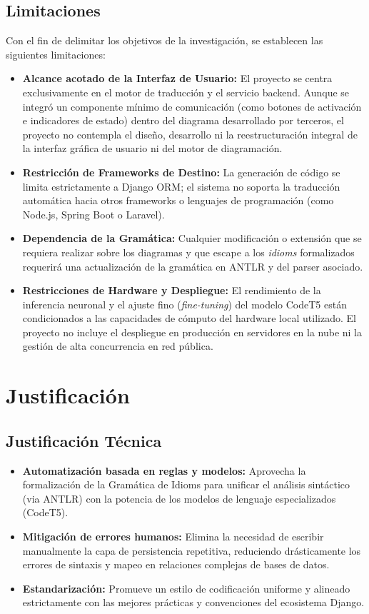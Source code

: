 \subsection{Limitaciones}
Con el fin de delimitar los objetivos de la investigación, se establecen las siguientes limitaciones:
\begin{itemize}
    \item \textbf{Alcance acotado de la Interfaz de Usuario:} El proyecto se centra exclusivamente en el motor de traducción y el servicio backend. Aunque se integró un componente mínimo de comunicación (como botones de activación e indicadores de estado) dentro del diagrama desarrollado por terceros, el proyecto no contempla el diseño, desarrollo ni la reestructuración integral de la interfaz gráfica de usuario ni del motor de diagramación.
    \item \textbf{Restricción de Frameworks de Destino:} La generación de código se limita estrictamente a Django ORM; el sistema no soporta la traducción automática hacia otros frameworks o lenguajes de programación (como Node.js, Spring Boot o Laravel).
    \item \textbf{Dependencia de la Gramática:} Cualquier modificación o extensión que se requiera realizar sobre los diagramas y que escape a los \textit{idioms} formalizados requerirá una actualización de la gramática en ANTLR y del parser asociado.
    \item \textbf{Restricciones de Hardware y Despliegue:} El rendimiento de la inferencia neuronal y el ajuste fino (\textit{fine-tuning}) del modelo CodeT5 están condicionados a las capacidades de cómputo del hardware local utilizado. El proyecto no incluye el despliegue en producción en servidores en la nube ni la gestión de alta concurrencia en red pública.
\end{itemize}

\section{Justificación}
\label{sec: justify}
\subsection{Justificación Técnica}
\begin{itemize}
    \item \textbf{Automatización basada en reglas y modelos:} Aprovecha la formalización de la Gramática de Idioms para unificar el análisis sintáctico (via ANTLR) con la potencia de los modelos de lenguaje especializados (CodeT5).
    \item \textbf{Mitigación de errores humanos:} Elimina la necesidad de escribir manualmente la capa de persistencia repetitiva, reduciendo drásticamente los errores de sintaxis y mapeo en relaciones complejas de bases de datos.
    \item \textbf{Estandarización:} Promueve un estilo de codificación uniforme y alineado estrictamente con las mejores prácticas y convenciones del ecosistema Django.
\end{itemize}

